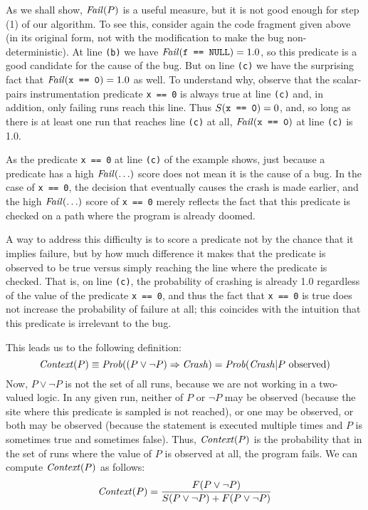 As we shall show, $\mbox{\textit{Fail}}(P)$ is a useful measure, but it is not good
enough for step (1) of our algorithm. To see this, consider again the
code fragment given above (in its original form, not with the
modification to make the bug non-deterministic).  At line {\tt (b)} we
have $\mbox{\textit{Fail}}(\mbox{\tt f == NULL}) = 1.0$, so this predicate is a good
candidate for the cause of the bug.
But on line {\tt (c)} we have the surprising fact that $\mbox{\textit{Fail}}(\mbox{\tt x == 0}) = 1.0$ as well.
To understand why, observe that the scalar-pairs instrumentation
predicate \texttt{x == 0} is always true at line {\tt (c)} and, in
addition,
only failing runs reach this line.
Thus $S(\mbox{\tt x == 0}) = 0$, and, so long as there is at least one run that
reaches line {\tt (c)} at all, $\mbox{\textit{Fail}}(\mbox{\tt x == 0})$ at line {\tt (c)} is 1.0.

As the predicate {\tt x == 0} at line {\tt (c)} of the example
shows, just because a predicate has a high $\mbox{\textit{Fail}}(\ldots)$ score does not
mean it is the cause of a bug.  In the case of {\tt x == 0}, the
decision that eventually causes the crash is made earlier, and the
high $\mbox{\textit{Fail}}(\ldots)$ score of {\tt x == 0} merely reflects the fact that this
predicate is checked on a path where the program is already doomed.

A way to address this difficulty is to score a predicate not by the chance
that it implies failure, but by how much difference it makes that the predicate
is observed to be true versus simply reaching the line where the predicate is checked.
That is, on line {\tt (c)}, the probability of crashing is already 1.0 regardless
of the value of the predicate {\tt x == 0}, and thus the fact that {\tt x == 0} is
true does not increase the probability of failure at all; this coincides with
the intuition that this predicate is irrelevant to the bug.

This leads us to the following definition:
\[ \mbox{\textit{Context}}(P) \equiv \mbox{\textit{Prob}}((P \lor \lnot P) \Rightarrow \mbox{\textit{Crash}})  = \mbox{\textit{Prob}}(\mbox{\textit{Crash}} |  P \mbox{ observed}) \]
Now, $P \lor \lnot P$ is not the set of all runs, because we are not working in a two-valued logic.
In any given run, neither of $P$ or $\lnot P$ may be observed (because the site where this predicate is
sampled is not reached), or one may be observed, or both may be observed (because the statement is executed
multiple times and $P$ is sometimes true and sometimes false).  Thus, $\mbox{\textit{Context}}(P)$ is the probability that
in the set of runs where the value of $P$ is observed at all, the program fails. We can compute $\mbox{\textit{Context}}(P)$ as follows:
\[ \mbox{\textit{Context}}(P) = \frac{F(P \lor \lnot P)}{S(P \lor \lnot P) + F(P \lor \lnot P)} \]

